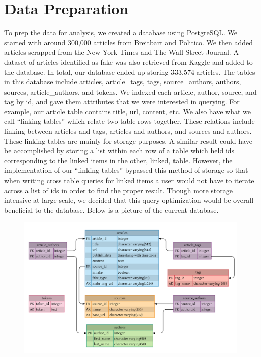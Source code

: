 \documentclass{eptcs}
\begin{document}
\section*{Data Preparation}
To prep the data for analysis, we created a database using PostgreSQL. We started with around 300,000 articles from Breitbart and Politico. We then added articles scrapped from the New York Times and The Wall Street Journal. A dataset of articles identified as fake was also retrieved from Kaggle and added to the database. In total, our database ended up storing 333,574 articles. The tables in this database include articles, article\_tags, tags, source\_authors, authors, sources, article\_authors, and tokens. We indexed each article, author, source, and tag by id, and gave them attributes that we were interested in querying. For example, our article table contains title, url, content, etc. We also have what we call “linking tables” which relate two table rows together. These relations include linking between articles and tags, articles and authors, and sources and authors. These linking tables are mainly for storage purposes. A similar result could have be accomplished by storing a list within each row of a table which held ids corresponding to the linked items in the other, linked, table. However, the implementation of our “linking tables” bypassed this method of storage so that when writing cross table queries for linked items a user would not have to iterate across a list of ids in order to find the proper result. Though more storage intensive at large scale, we decided that this query optimization would be overall beneficial to the database. Below is a picture of the current database.
\begin{figure}[H]
	\centering
	\includegraphics[scale=.3]{db_diagram}
\end{figure}
\end{document}
